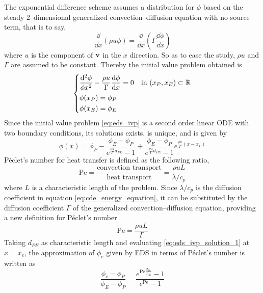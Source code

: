 The exponential difference scheme assumes a distribution for $\phi$ based on the steady 2--dimensional generalized convection--diffusion equation with no source term, that is to say,
\begin{equation}
	\frac{\dd}{\dd{x}} (\rho u \phi) = \frac{\dd}{\dd{x}} \left( \Gamma \frac{\dd{\phi}}{\dd{x}} \right)
\end{equation}
where $u$ is the component of $\vb{v}$ in the $x$ direction. So as to ease the study, $\rho u$ and $\Gamma$ are assumed to be constant. Thereby the initial value problem obtained is
\begin{equation} \label{eq:eds_ivp}
	\left\{
	\begin{aligned}
		&\frac{\dd^2 \phi}{\phi{x^2}} - \frac{\rho u}{\Gamma} \frac{\dd{\phi}}{\dd{x}} = 0 & &\text{in } (x_P, x_E) \subset \mathbb{R} \\
		&\phi(x_P) = \phi_P \\
		&\phi(x_E) = \phi_E \\
	\end{aligned}
	\right.
\end{equation}
Since the initial value problem \eqref{eq:eds_ivp} is a second order linear ODE with two boundary conditions, its solutions exists, is unique, and is given by
\begin{equation} \label{eq:eds_ivp_solution_1}
	\phi(x) = 
	\phi_P - 
	\frac{\phi_E - \phi_P}{e^{\frac{\rho u}{\Gamma} d_{PE}} - 1} + 
	\frac{\phi_E - \phi_P}{e^{\frac{\rho u}{\Gamma} d_{PE}} - 1} e^{\frac{\rho u}{\Gamma} (x - x_P)}
\end{equation}
Péclet's number for heat transfer is defined as the following ratio,
\begin{equation}
	\mathrm{Pe} = 
	\frac{\text{convection transport}}{\text{heat transport}} = 
	\frac{\rho u L}{\lambda / c_p}
\end{equation}
where $L$ is a characteristic length of the problem. Since $\lambda / c_p$ is the diffusion coefficient in equation \eqref{eq:cde_energy_equation}, it can be substituted by the diffusion coefficient $\Gamma$ of the generalized convection--diffusion equation, providing a new definition for Péclet's number 
\begin{equation}
	\mathrm{Pe} = 
	\frac{\rho u L}{\Gamma}
\end{equation}
Taking $d_{PE}$ as characteristic length and evaluating \eqref{eq:eds_ivp_solution_1} at $x = x_e$, the approximation of $\phi_e$ given by EDS in terms of Péclet's number is written as
\begin{equation}
	\frac{\phi_e - \phi_P}{\phi_E - \phi_P} =
	\frac{e^{\mathrm{Pe} \frac{d_{Pe}}{d_{PE}}} - 1}{e^{\mathrm{Pe}} - 1} 
\end{equation}


